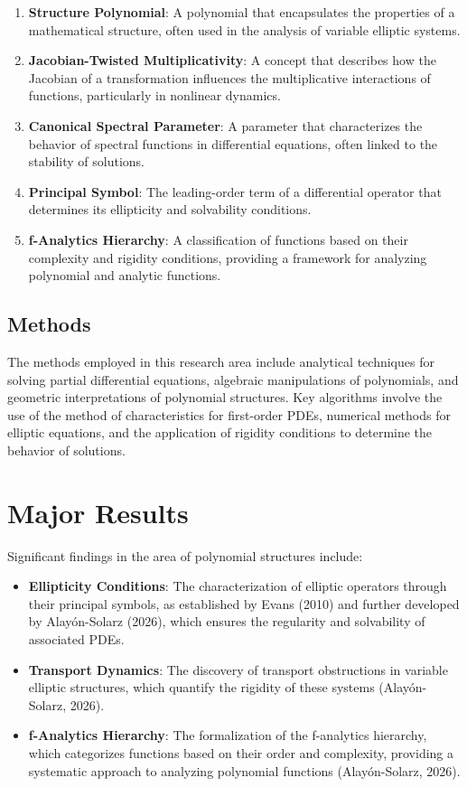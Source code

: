 \documentclass[11pt,a4paper]{article}
\begin{document}
\begin{enumerate}
\item \textbf{Structure Polynomial}: A polynomial that encapsulates the properties of a mathematical structure, often used in the analysis of variable elliptic systems.
\item \textbf{Jacobian-Twisted Multiplicativity}: A concept that describes how the Jacobian of a transformation influences the multiplicative interactions of functions, particularly in nonlinear dynamics.
\item \textbf{Canonical Spectral Parameter}: A parameter that characterizes the behavior of spectral functions in differential equations, often linked to the stability of solutions.
\item \textbf{Principal Symbol}: The leading-order term of a differential operator that determines its ellipticity and solvability conditions.
\item \textbf{f-Analytics Hierarchy}: A classification of functions based on their complexity and rigidity conditions, providing a framework for analyzing polynomial and analytic functions.
\end{enumerate}

\subsection{Methods}

The methods employed in this research area include analytical techniques for solving partial differential equations, algebraic manipulations of polynomials, and geometric interpretations of polynomial structures. Key algorithms involve the use of the method of characteristics for first-order PDEs, numerical methods for elliptic equations, and the application of rigidity conditions to determine the behavior of solutions.

\section{Major Results}

Significant findings in the area of polynomial structures include:

\begin{itemize}
\item \textbf{Ellipticity Conditions}: The characterization of elliptic operators through their principal symbols, as established by Evans (2010) and further developed by Alayón-Solarz (2026), which ensures the regularity and solvability of associated PDEs.
\item \textbf{Transport Dynamics}: The discovery of transport obstructions in variable elliptic structures, which quantify the rigidity of these systems (Alayón-Solarz, 2026).
\item \textbf{f-Analytics Hierarchy}: The formalization of the f-analytics hierarchy, which categorizes functions based on their order and complexity, providing a systematic approach to analyzing polynomial functions (Alayón-Solarz, 2026).
\end{itemize}
\end{document}
